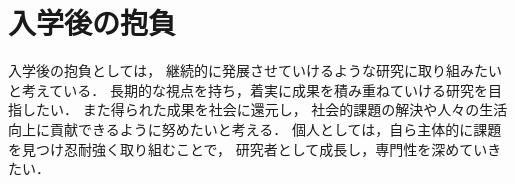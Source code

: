 \section{入学後の抱負}
  入学後の抱負としては，
  継続的に発展させていけるような研究に取り組みたいと考えている．
  長期的な視点を持ち，着実に成果を積み重ねていける研究を目指したい．
  また得られた成果を社会に還元し，
  社会的課題の解決や人々の生活向上に貢献できるように努めたいと考える．
  個人としては，自ら主体的に課題を見つけ忍耐強く取り組むことで，
  研究者として成長し，専門性を深めていきたい．

